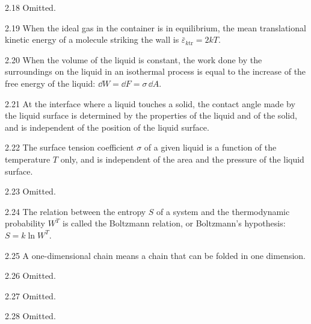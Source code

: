 \begin{hint}{2.18}
Omitted.
\end{hint}

\begin{hint}{2.19}
When the ideal gas in the container is in equilibrium, the mean translational kinetic energy of a molecule striking the wall is $\bar\varepsilon_{k\text{tr}}=2kT$.
\end{hint}

\begin{hint}{2.20}
When the volume of the liquid is constant, the work done by the surroundings on the liquid in an isothermal process is equal to the increase of the free energy of the liquid: $\dd W=\dd F=\sigma\,\dd A$.
\end{hint}

\begin{hint}{2.21}
At the interface where a liquid touches a solid, the contact angle made by the liquid surface is determined by the properties of the liquid and of the solid, and is independent of the position of the liquid surface.
\end{hint}

\begin{hint}{2.22}
The surface tension coefficient $\sigma$ of a given liquid is a function of the temperature $T$ only, and is independent of the area and the pressure of the liquid surface.
\end{hint}

\begin{hint}{2.23}
Omitted.
\end{hint}

\begin{hint}{2.24}
The relation between the entropy $S$ of a system and the thermodynamic probability $W^T$ is called the Boltzmann relation, or Boltzmann's hypothesis: $S=k\ln W^T$.
\end{hint}

\begin{hint}{2.25}
A one-dimensional chain means a chain that can be folded in one dimension.
\end{hint}

\begin{hint}{2.26}
Omitted.
\end{hint}

\begin{hint}{2.27}
Omitted.
\end{hint}

\begin{hint}{2.28}
Omitted.
\end{hint}


